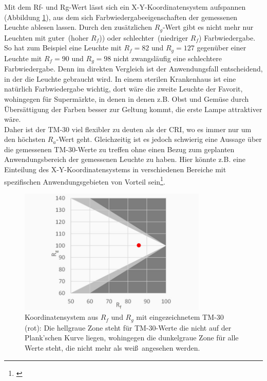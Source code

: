 Mit dem Rf- und Rg-Wert lässt sich ein X-Y-Koordinatensystem aufspannen (Abbildung \ref{b_tm302}), aus dem sich Farbwiedergabeeigenschaften der gemessenen Leuchte ablesen lassen. Durch den zusätzlichen $R_{g}$-Wert gibt es nicht mehr nur Leuchten mit \glqq guter\grqq\ (hoher $R_{f}$)) oder \glqq schlechter\grqq\ (niedriger $R_{f}$) Farbwiedergabe. So hat zum Beispiel eine Leuchte mit $R_{f}=82$ und $R_{g}=127$ gegenüber einer Leuchte mit $R_{f}=90$ und $R_{g}=98$ nicht zwangsläufig eine schlechtere Farbwiedergabe. Denn im direkten Vergleich ist der Anwendungsfall entscheidend, in der die Leuchte gebraucht wird. In einem sterilen Krankenhaus ist eine natürlich Farbwiedergabe wichtig, dort wäre die zweite Leuchte der Favorit, wohingegen für Supermärkte, in denen in denen z.B. Obst und Gemüse durch Übersättigung der Farben besser zur Geltung kommt, die erste Lampe attraktiver wäre.\\
Daher ist der TM-30 viel flexibler zu deuten als der CRI, wo es immer nur um den höchsten $R_{a}$-Wert geht. Gleichzeitig ist es jedoch schwierig eine Aussage über die gemessenen TM-30-Werte zu treffen ohne einen Bezug zum geplanten Anwendungsbereich der gemessenen Leuchte zu haben. Hier könnte z.B. eine Einteilung des X-Y-Koordinatensystems in verschiedenen Bereiche mit spezifischen Anwendungsgebieten von Vorteil sein\footnote{\cite[4]{royer}}.  


\begin{figure}[H]     %
\centering
\includegraphics[width=0.8\textwidth]{bilder/tm302} 
\caption {Koordinatensystem aus $R_{f}$ und $R_{g}$ mit eingezeichnetem TM-30 (rot): Die hellgraue Zone steht für TM-30-Werte die nicht auf der Plank'schen Kurve liegen, wohingegen die dunkelgraue Zone für alle Werte steht, die nicht mehr als \glqq weiß\grqq\ angesehen werden\protect\footnotemark .}\label{b_tm302}
\end{figure}

